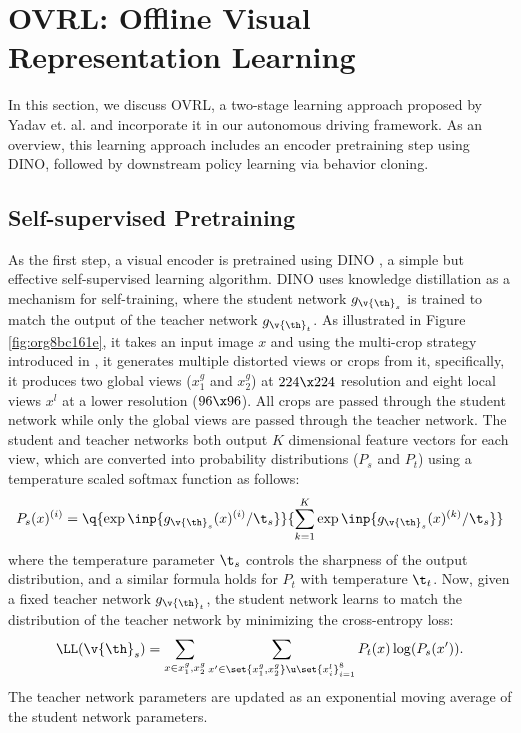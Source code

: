 \documentclass[letterpaper, 12pt]{book}
\theoremstyle{definition}
\theoremstyle{definition}
\theoremstyle{definition}
\theoremstyle{definition}
\theoremstyle{definition}
\newcommand{\vth}{\v{\th}}
\begin{document}
\section{OVRL: Offline Visual Representation Learning}
\label{sec:org53b2f46}
In this section, we discuss OVRL\cite{Yadav2022}, a two-stage learning approach
proposed by Yadav et. al. and incorporate it in our autonomous driving
framework. As an overview, this learning approach includes an encoder
pretraining step using DINO, followed by downstream policy learning via behavior
cloning.
\subsection{Self-supervised Pretraining}
\label{sec:org8fe2aee}
As the first step, a visual encoder is pretrained using DINO \cite{Caron2021}, a
simple but effective self-supervised learning algorithm. DINO uses knowledge
distillation as a mechanism for self-training, where the student network
\(g_{\vth_{s}}\) is trained to match the output of the teacher network
\(g_{\vth_{t}}\).  As illustrated in Figure \ref{fig:org8bc161e}, it takes an input image
\(x\) and using the multi-crop strategy introduced in \cite{Caron2020}, it
generates multiple distorted views or crops from it, specifically, it produces
two global views (\(x_{1}^{g}\) and \(x_{2}^{g}\)) at \(224\x 224\) resolution
and eight local views \(x^{l}\) at a lower resolution (\(96\x 96\)). All crops
are passed through the student network while only the global views are passed
through the teacher network.  The student and teacher networks both output \(K\)
dimensional feature vectors for each view, which are converted into probability
distributions (\(P_{s}\) and \(P_{t}\)) using a temperature scaled softmax
function as follows:
\[P_{s}(x)^{(i)}=\q{\exp\inp{g_{\vth_{s}}(x)^{(i)}/\t_{s}}}{\sum_{k=1}^{K}\exp\inp{g_{\vth_{s}}(x)^{(k)}/\t_{s}}}\]
where the temperature parameter \(\t_{s}\) controls the sharpness of the output
distribution, and a similar formula holds for \(P_{t}\) with temperature
\(\t_{t}\). Now, given a fixed teacher network \(g_{\vth_{t}}\), the student
network learns to match the distribution of the teacher network by minimizing
the cross-entropy loss:
\[\LL(\vth_{s})=\sum_{x\in{x_{1}^{g},x_{2}^{g}}}\sum_{x'\in
\set{x_{1}^{g},x_{2}^{g}}\u\set{x^{l}_{i}}_{i=1}^{8}}P_{t}(x)\log(P_{s}(x')).\] The
teacher network parameters are updated as an exponential moving average of the
student network parameters.
\end{document}

